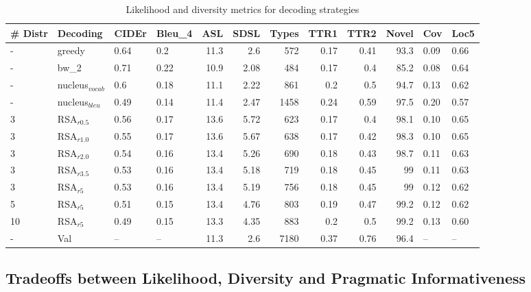 \documentclass[11pt,a4paper]{article}
\begin{document}
\begin{table*}
\small
\centering
\begin{tabular}{llllrrrrrrll}
\toprule
 \# Distr & Decoding           & CIDEr   & Bleu\_4   &   ASL &   SDSL &   Types &   TTR1 &   TTR2 &   Novel & Cov   & Loc5   \\
\midrule
 - & greedy           & 0.64    & 0.2      &  11.3 &    2.6  &     572 &   0.17 &   0.41 &    93.3 & 0.09  & 0.66   \\
 - & bw\_2             & 0.71    & 0.22     &  10.9 &   2.08 &     484 &   0.17 &   0.4  &    85.2 & 0.08  & 0.64   \\
 \midrule
 - & nucleus$_{vocab}$  & 0.6     & 0.18     &  11.1 &   2.22 &     861 &   0.2  &   0.5  &    94.7 & 0.13  & 0.62   \\
 - & nucleus$_{bleu}$  & 0.49    & 0.14     &  11.4 &   2.47 &    1458 &   0.24 &   0.59 &    97.5 & 0.20  & 0.57   \\
 \midrule
 3 & RSA$_{r0.5}$  & 0.56    & 0.17     &  13.6 &   5.72 &     623 &   0.17 &   0.4  &    98.1 & 0.10  & 0.65   \\
 3 & RSA$_{r1.0}$  & 0.55    & 0.17     &  13.6 &   5.67 &     638 &   0.17 &   0.42 &    98.3 & 0.10  & 0.65   \\
 3 & RSA$_{r2.0}$  & 0.54    & 0.16     &  13.4 &   5.26 &     690 &   0.18 &   0.43 &    98.7 & 0.11  & 0.63   \\
 3 & RSA$_{r3.5}$  & 0.53    & 0.16     &  13.4 &   5.18 &     719 &   0.18 &   0.45 &    99   & 0.11  & 0.63   \\
 3 & RSA$_{r5}$  & 0.53    & 0.16     &  13.4 &   5.19 &     756 &   0.18 &   0.45 &    99   & 0.12  & 0.62   \\
 \midrule
 5 & RSA$_{r5}$  & 0.51    & 0.15     &  13.4 &   4.76 &     803 &   0.19 &   0.47 &    99.2 & 0.12  & 0.62   \\
 \midrule
 10 & RSA$_{r5}$ & 0.49    & 0.15     &  13.3 &   4.35 &     883 &   0.2  &   0.5  &    99.2 & 0.13  & 0.60   \\
 \midrule 
 - & Val              & --      & --       &  11.3 &   2.6  &    7180 &   0.37 &   0.76 &    96.4 & --    & --     \\
\bottomrule
\end{tabular}
\caption{Likelihood and diversity metrics for decoding strategies}
\end{table*}



\subsection{Tradeoffs between Likelihood, Diversity and Pragmatic Informativeness}
\end{document}
